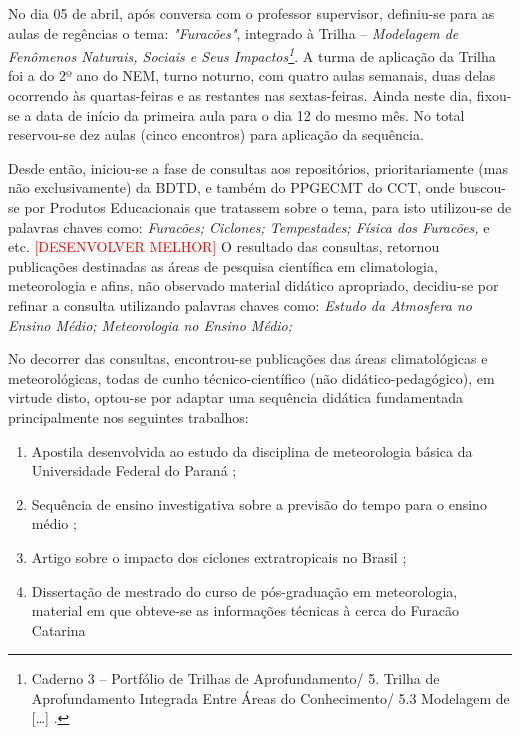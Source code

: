 No dia 05 de abril, após conversa com o professor supervisor, definiu-se para as aulas de regências o tema: \textit{"Furacões"}, integrado à Trilha -- \textit{Modelagem de Fenômenos Naturais, Sociais e Seus Impactos\footnote{Caderno 3 -- Portfólio de Trilhas de Aprofundamento/ 5. Trilha de Aprofundamento Integrada Entre Áreas do Conhecimento/ 5.3 Modelagem de [\ldots] \cite[pp.~191-205]{CATARINA:2021c}.}}. A turma de aplicação da Trilha foi a do 2º ano do \ac{NEM}, turno noturno, com quatro aulas semanais, duas delas ocorrendo às quartas-feiras e as restantes nas sextas-feiras. Ainda neste dia, fixou-se a data de início da primeira aula para o dia 12 do mesmo mês. No total reservou-se dez aulas (cinco encontros) para aplicação da sequência.

Desde então, iniciou-se a fase de consultas aos repositórios, prioritariamente (mas não exclusivamente) da \ac{BDTD}, e também do \ac{PPGECMT} do \ac{CCT}, onde buscou-se por Produtos Educacionais que tratassem sobre o tema, para isto utilizou-se de palavras chaves como: \textit{Furacões; Ciclones; Tempestades; Física dos Furacões,} e etc.
\textcolor{red}{[DESENVOLVER MELHOR]}
O resultado das consultas, retornou publicações destinadas as áreas de pesquisa científica em climatologia, meteorologia e afins, não observado material didático apropriado, decidiu-se por refinar a consulta utilizando palavras chaves como: \textit{Estudo da Atmosfera no Ensino Médio; Meteorologia no Ensino Médio;}

No decorrer das consultas, encontrou-se publicações das áreas climatológicas e meteorológicas, todas de cunho técnico-científico (não didático-pedagógico), em virtude disto, optou-se por adaptar uma sequência didática fundamentada principalmente nos seguintes trabalhos:
\begin{enumerate}[label=\roman *)]
	\item Apostila desenvolvida ao estudo da disciplina de meteorologia básica da Universidade Federal do Paraná \cite{GRIMM:1999};
	\item Sequência de ensino investigativa sobre a previsão do tempo para o ensino médio \cite{MARIO:2017};
	\item Artigo sobre o impacto dos ciclones extratropicais no Brasil \cite{MARRAFON:2021};
	\item Dissertação de mestrado do curso de pós-graduação em meteorologia, material em que obteve-se as informações técnicas à cerca do Furacão Catarina \cite{ROCHA:2014} 
\end{enumerate}

